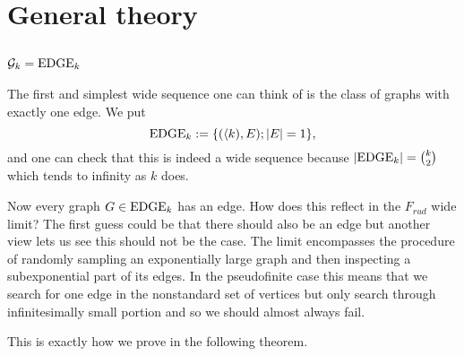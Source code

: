 \chapter{General theory}\label{chapgeneraltheory}
\section{$\mathcal{G}_k=\text{EDGE}_k$}
The first and simplest wide sequence one can think of is the class of graphs with exactly one edge. We put
\[\text{EDGE}_k:=\{\text{$(\langle k),E); \left|{E}\right|=1$}\},\]
and one can check that this is indeed a wide sequence because $\left|{\text{EDGE}_k}\right|=\binom{k}{2}$ which tends to infinity as $k$ does.

Now every graph $G\in\text{EDGE}_k$ has an edge. How does this reflect in the $F_{rud}$ wide limit? The first guess could be that there should also be an edge but another view lets us see this should not be the case. The limit encompasses the procedure of randomly sampling an exponentially large graph and then inspecting a subexponential part of its edges. In the pseudofinite case this means that we search for one edge in the nonstandard set of vertices but only search through infinitesimally small portion and so we should almost always fail.

This is exactly how we prove in the following theorem.

